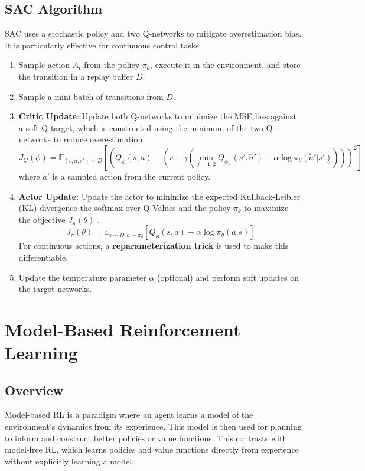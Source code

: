 \documentclass[12pt]{article}
\begin{document}
\subsection{SAC Algorithm}
SAC uses a stochastic policy and two Q-networks to mitigate overestimation bias. It is particularly effective for continuous control tasks.
\begin{enumerate}
    \item Sample action $A_t$ from the policy $\pi_\theta$, execute it in the environment, and store the transition in a replay buffer $D$.
    \item Sample a mini-batch of transitions from $D$.
    \item \textbf{Critic Update}: Update both Q-networks to minimize the MSE loss against a soft Q-target, which is constructed using the minimum of the two Q-networks to reduce overestimation.
    $$ J_Q(\phi) = \mathbb{E}_{(s,a,s') \sim D} \left[ \left( Q_\phi(s,a) - \left(r + \gamma \left( \min_{j=1,2} Q_{\phi_j^-}(s', \tilde{a}') - \alpha \log \pi_\theta(\tilde{a}'|s') \right)\right) \right)^2 \right] $$
    where $\tilde{a}'$ is a sampled action from the current policy.
    \item \textbf{Actor Update}: Update the actor to minimize the expected Kullback-Leibler (KL) divergence the softmax over Q-Values and the policy $\pi_\theta$ to maximize the objective $ J_\pi(\theta)$  . 
    $$ J_\pi(\theta) = \mathbb{E}_{s \sim D, a \sim \pi_\theta} [ Q_\phi(s,a) - \alpha \log \pi_\theta(a|s)] $$
    For continuous actions, a \textbf{reparameterization trick} is used to make this differentiable.
    \item Update the temperature parameter $\alpha$ (optional) and perform soft updates on the target networks.
\end{enumerate}



\section{Model-Based Reinforcement Learning }

\subsection{Overview}
Model-based RL is a paradigm where an agent learns a model of the environment's dynamics from its experience. This model is then used for planning to inform and construct better policies or value functions. This contrasts with model-free RL, which learns policies and value functions directly from experience without explicitly learning a model.
\end{document}
